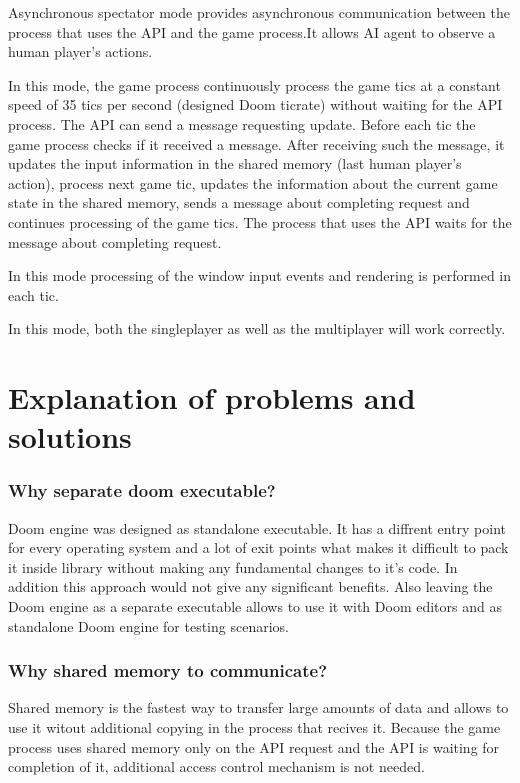 	    Asynchronous spectator mode provides asynchronous communication between the process that uses the API and the game process.It allows AI agent to observe a human player's actions. 
	    
	    In this mode, the game process continuously process the game tics at a constant speed of 35 tics per second (designed Doom ticrate) without waiting for the API process. The API can send a message requesting update. Before each tic the game process checks if it received a message. After receiving such the message, it updates the input information in the shared memory (last human player's action), process next game tic, updates the information about the current game state in the shared memory, sends a message about completing request and continues processing of the game tics. The process that uses the API waits for the message about completing request.

        In this mode processing of the window input events and rendering is performed in each tic.
        
        In this mode, both the singleplayer as well as the multiplayer will work correctly.

\section{Explanation of problems and solutions}\label{sec:architecture_solutions}

\subsubsection{Why separate doom executable?}

Doom engine was designed as standalone executable. It has a diffrent entry point for every operating system and a lot of exit points what makes it difficult to pack it inside library without making any fundamental changes to it's code. In addition this approach would not give any significant benefits. Also leaving the Doom engine as a separate executable allows to use it with Doom editors and as standalone Doom engine for testing scenarios.

\subsubsection{Why shared memory to communicate?}

Shared memory is the fastest way to transfer large amounts of data and allows to use it witout additional copying in the process that recives it. 
Because the game process uses shared memory only on the API request and the API is waiting for completion of it, additional access control mechanism is not needed.

